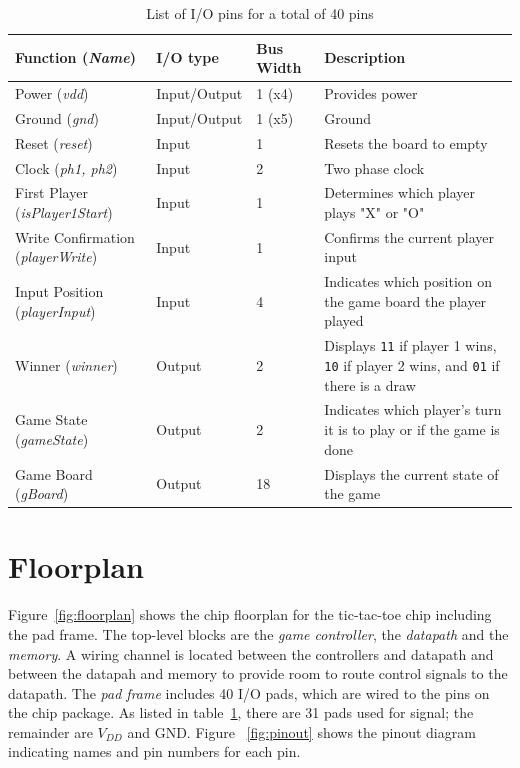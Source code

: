 \documentclass[]{article}
\begin{document}
\begin{table}
\centering
\caption{List of I/O pins for a total of 40 pins}
\begin{tabular}{ | l | l | l | p{5cm} |}
\hline
    Function (\emph{Name})                  & I/O type     & Bus Width & Description \\
\hline
    Power (\emph {vdd})                     & Input/Output & 1 (x4)    & Provides power \\
\hline
    Ground (\emph{gnd})                     & Input/Output & 1 (x5)    & Ground \\
\hline
    Reset (\emph{reset})                    & Input        & 1         & Resets the board to empty \\
\hline 
    Clock (\emph{ph1, ph2})                 & Input        & 2         & Two phase clock\\
\hline
    First Player (\emph{isPlayer1Start})    & Input        & 1         & Determines which player plays "X" or "O" \\
\hline
    Write Confirmation (\emph{playerWrite}) & Input        & 1         & Confirms the current player input \\
\hline
    Input Position (\emph{playerInput})     & Input        & 4         & Indicates which position on the game board the player played \\
\hline
    Winner (\emph{winner})                  & Output       & 2         & Displays \texttt{11} if player 1 wins, \texttt{10} if player 2 wins, and \texttt{01} if there is a draw \\
\hline
    Game State (\emph{gameState})           & Output       & 2         & Indicates which player's turn it is to play or if the game is done\\
\hline
    Game Board (\emph{gBoard})              & Output       & 18        & Displays the current state of the game \\
    \hline
\end{tabular}
\label{tab:io-list}
\end{table}


\section{Floorplan}
\label{sec:floorplan}
Figure~\ref{fig:floorplan} shows the chip floorplan for the tic-tac-toe chip including the pad frame. The top-level blocks are the \emph{game controller}, the \emph{datapath} and the \emph{memory}. A wiring channel is located between the controllers and datapath and between the datapah and memory to provide room to route control signals to the datapath. The \emph{pad frame} includes 40 I/O pads, which are wired to the pins on the chip package. As listed in table~\ref{tab:io-list}, there are 31 pads used for signal; the remainder are $V_{DD}$ and GND. Figure ~\ref{fig:pinout} shows the pinout diagram indicating names and pin numbers for each pin.
\end{document}
